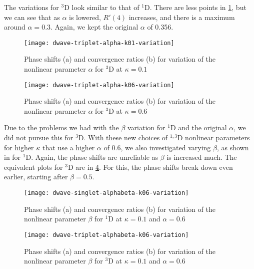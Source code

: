 \documentclass[Dissertation.tex]{subfiles}
\begin{document}
The variations for $^3$D look similar to that of $^1$D. There are less points
in \cref{fig:dwave-triplet-alpha-k01-variation}, but we can see that as
$\alpha$ is lowered, $R'(4)$ increases, and there is a maximum around
$\alpha = 0.3$. Again, we kept the original $\alpha$ of 0.356.

\begin{figure}
	\centering
	\texttt{[image: dwave-triplet-alpha-k01-variation]}
	\caption[Variation of the nonlinear parameter $\alpha$ for $^{3}$D at $\kappa = 0.1$]{Phase shifts (a) and convergence ratios (b) for variation of the nonlinear parameter $\alpha$ for $^{3}$D at $\kappa = 0.1$}
	\label{fig:dwave-triplet-alpha-k01-variation}
\end{figure}



\begin{figure}
	\centering
	\texttt{[image: dwave-triplet-alpha-k06-variation]}
	\caption[Variation of the nonlinear parameter $\alpha$ for $^{3}$D at $\kappa = 0.6$]{Phase shifts (a) and convergence ratios (b) for variation of the nonlinear parameter $\alpha$ for $^{3}$D at $\kappa = 0.6$}
	\label{fig:dwave-triplet-alpha-k06-variation}
\end{figure}

Due to the problems we had with the $\beta$ variation for $^1$D
and the original $\alpha$, we did not pursue this for $^3$D.
With these new choices of $^{1,3}$D nonlinear parameters for higher $\kappa$
that use a higher $\alpha$ of 0.6, we also investigated varying $\beta$, as
shown in  for $^1$D.
Again, the phase shifts are unreliable as $\beta$ is increased much.
The equivalent plots for $^3$D are in \cref{fig:dwave-triplet-alphabeta-k06-variation}.
For this, the phase shifts break down even earlier, starting after $\beta = 0.5$.

\begin{figure}
	\centering
	\texttt{[image: dwave-singlet-alphabeta-k06-variation]}
	\caption[Variation of the nonlinear parameter $\beta$ for $^{1}$D at $\kappa = 0.1$ and $\alpha = 0.6$]{Phase shifts (a) and convergence ratios (b) for variation of the nonlinear parameter $\beta$ for $^{1}$D at $\kappa = 0.1$ and $\alpha = 0.6$}
	\label{fig:dwave-singlet-alphabeta-k06-variation}
\end{figure}

\begin{figure}
	\centering
	\texttt{[image: dwave-triplet-alphabeta-k06-variation]}
	\caption[Variation of the nonlinear parameter $\beta$ for $^{3}$D at $\kappa = 0.1$ and $\alpha = 0.6$]{Phase shifts (a) and convergence ratios (b) for variation of the nonlinear parameter $\beta$ for $^{3}$D at $\kappa = 0.1$ and $\alpha = 0.6$}
	\label{fig:dwave-triplet-alphabeta-k06-variation}
\end{figure}
\end{document}
